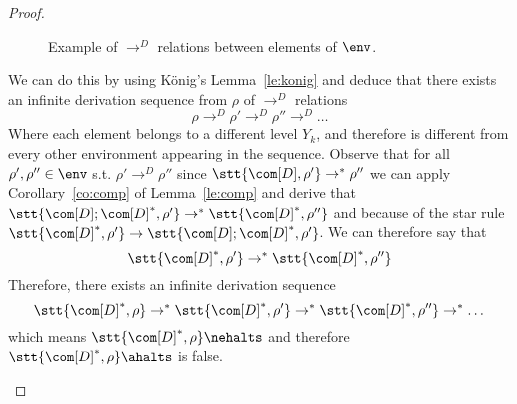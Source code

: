 \begin{proof}
\begin{itemize}
\begin{figure}
      \caption{Example of \(\to^D\) relations between elements of
        \(\env\).}\label{fig:tree}
    \end{figure}

    We can do this by using König's Lemma~\ref{le:konig} and deduce
    that there exists an infinite derivation sequence from \(\rho\) of
    \(\to^D\) relations
    \begin{equation*}
      \rho \to^D \rho' \to^D \rho'' \to^D \dots
    \end{equation*}
    Where each element belongs to a different level \(Y_k\), and
    therefore is different from every other environment appearing in
    the sequence. Observe that for all \(\rho', \rho''\in\env\)
    s.t. \(\rho' \to^D \rho''\) since
    \(\stt{\com[D], \rho'} \to^* \rho''\) we can apply
    Corollary~\ref{co:comp} of Lemma~\ref{le:comp} and derive that
    \(\stt{\com[D];\com[D]^*, \rho'} \to^* \stt{\com[D]^*, \rho''}\)
    and because of the star rule
    \(\stt{\com[D]^*, \rho'} \to \stt{\com[D];\com[D]^*, \rho'}\). We
    can therefore say that
    \begin{equation*}
      \stt{\com[D]^*, \rho'} \to^* \stt{\com[D]^*, \rho''}
    \end{equation*}
    Therefore, there exists an infinite derivation sequence  
    \begin{equation*}
      \stt{\com[D]^*, \rho} \to^*\stt{\com[D]^*, \rho'} \to^* \stt{\com[D]^*, \rho''} \to^* \dots
    \end{equation*}
    which means \(\stt{\com[D]^*, \rho}\nehalts\) and therefore
    \(\stt{\com[D]^*, \rho} \ahalts\) is false.
    

\end{itemize}
\end{proof}
